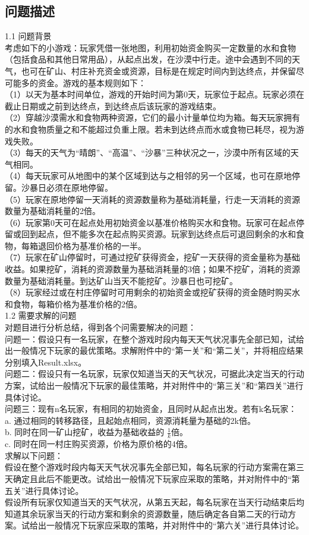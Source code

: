 \documentclass[UTF8]{article}
\begin{document}
\subsection*{问题描述}
1.1 问题背景\\
考虑如下的小游戏：玩家凭借一张地图，利用初始资金购买一定数量的水和食物（包括食品和其他日常用品），从起点出发，在沙漠中行走。途中会遇到不同的天气，也可在矿山、村庄补充资金或资源，目标是在规定时间内到达终点，并保留尽可能多的资金。游戏的基本规则如下：\\
（1）以天为基本时间单位，游戏的开始时间为第0天，玩家位于起点。玩家必须在截止日期或之前到达终点，到达终点后该玩家的游戏结束。\\
（2）穿越沙漠需水和食物两种资源，它们的最小计量单位均为箱。每天玩家拥有的水和食物质量之和不能超过负重上限。若未到达终点而水或食物已耗尽，视为游戏失败。\\
（3）每天的天气为“晴朗”、“高温”、“沙暴”三种状况之一，沙漠中所有区域的天气相同。\\
（4）每天玩家可从地图中的某个区域到达与之相邻的另一个区域，也可在原地停留。沙暴日必须在原地停留。\\
（5）玩家在原地停留一天消耗的资源数量称为基础消耗量，行走一天消耗的资源数量为基础消耗量的2倍。\\
（6）玩家第0天可在起点处用初始资金以基准价格购买水和食物。玩家可在起点停留或回到起点，但不能多次在起点购买资源。玩家到达终点后可退回剩余的水和食物，每箱退回价格为基准价格的一半。\\
（7）玩家在矿山停留时，可通过挖矿获得资金，挖矿一天获得的资金量称为基础收益。如果挖矿，消耗的资源数量为基础消耗量的3倍；如果不挖矿，消耗的资源数量为基础消耗量。到达矿山当天不能挖矿。沙暴日也可挖矿。\\
（8）玩家经过或在村庄停留时可用剩余的初始资金或挖矿获得的资金随时购买水和食物，每箱价格为基准价格的2倍。\\
1.2 需要求解的问题\\
对题目进行分析总结，得到各个问需要解决的问题：\\
问题一：假设只有一名玩家，在整个游戏时段内每天天气状况事先全部已知，试给出一般情况下玩家的最优策略。求解附件中的“第一关”和“第二关”，并将相应结果分别填入Result.xlsx。\\
问题二：假设只有一名玩家，玩家仅知道当天的天气状况，可据此决定当天的行动方案，试给出一般情况下玩家的最佳策略，并对附件中的“第三关”和“第四关”进行具体讨论。\\
问题三：现有n名玩家，有相同的初始资金，且同时从起点出发。若有k名玩家：\\
a. 通过相同的转移路径，且起始点相同，资源消耗量为基础的2k倍。\\
b. 同时在同一矿山挖矿，收益为基础收益的 $\frac1k$倍。\\
c. 同时在同一村庄购买资源，价格为原价格的4倍。\\
求解以下问题：\\
假设在整个游戏时段内每天天气状况事先全部已知，每名玩家的行动方案需在第三天确定且此后不能更改。试给出一般情况下玩家应采取的策略，并对附件中的“第五关”进行具体讨论。\\
假设所有玩家仅知道当天的天气状况，从第五天起，每名玩家在当天行动结束后均知道其余玩家当天的行动方案和剩余的资源数量，随后确定各自第二天的行动方案。试给出一般情况下玩家应采取的策略，并对附件中的“第六关”进行具体讨论。\\
\end{document}
